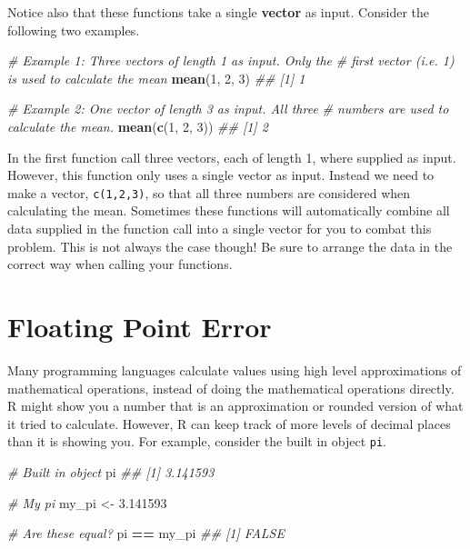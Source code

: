 \documentclass[
]{book}
\newenvironment{Shaded}{\begin{snugshade}}{\end{snugshade}}
\newcommand{\CommentTok}[1]{\textcolor[rgb]{0.56,0.35,0.01}{\textit{#1}}}
\newcommand{\DecValTok}[1]{\textcolor[rgb]{0.00,0.00,0.81}{#1}}
\newcommand{\FloatTok}[1]{\textcolor[rgb]{0.00,0.00,0.81}{#1}}
\newcommand{\KeywordTok}[1]{\textcolor[rgb]{0.13,0.29,0.53}{\textbf{#1}}}
\newcommand{\NormalTok}[1]{#1}
\newcommand{\OperatorTok}[1]{\textcolor[rgb]{0.81,0.36,0.00}{\textbf{#1}}}
\newcommand{\StringTok}[1]{\textcolor[rgb]{0.31,0.60,0.02}{#1}}
\begin{document}
Notice also that these functions take a single \textbf{vector} as input. Consider the following two examples.

\begin{Shaded}
\begin{Highlighting}[]

\CommentTok{# Example 1: Three vectors of length 1 as input.  Only the}
\CommentTok{# first vector (i.e. 1) is used to calculate the mean}
\KeywordTok{mean}\NormalTok{(}\DecValTok{1}\NormalTok{, }\DecValTok{2}\NormalTok{, }\DecValTok{3}\NormalTok{)}
\CommentTok{## [1] 1}

\CommentTok{# Example 2: One vector of length 3 as input.  All three}
\CommentTok{# numbers are used to calculate the mean.}
\KeywordTok{mean}\NormalTok{(}\KeywordTok{c}\NormalTok{(}\DecValTok{1}\NormalTok{, }\DecValTok{2}\NormalTok{, }\DecValTok{3}\NormalTok{))}
\CommentTok{## [1] 2}
\end{Highlighting}
\end{Shaded}

In the first function call three vectors, each of length 1, where supplied as input. However, this function only uses a single vector as input. Instead we need to make a vector, \texttt{c(1,2,3)}, so that all three numbers are considered when calculating the mean. Sometimes these functions will automatically combine all data supplied in the function call into a single vector for you to combat this problem. This is not always the case though! Be sure to arrange the data in the correct way when calling your functions.

\hypertarget{floating-point-error}{%
\section{Floating Point Error}\label{floating-point-error}}

Many programming languages calculate values using high level approximations of mathematical operations, instead of doing the mathematical operations directly. R might show you a number that is an approximation or rounded version of what it tried to calculate. However, R can keep track of more levels of decimal places than it is showing you. For example, consider the built in object \texttt{pi}.

\begin{Shaded}
\begin{Highlighting}[]
\CommentTok{# Built in object}
\NormalTok{pi}
\CommentTok{## [1] 3.141593}

\CommentTok{# My pi}
\NormalTok{my_pi <-}\StringTok{ }\FloatTok{3.141593}

\CommentTok{# Are these equal?}
\NormalTok{pi }\OperatorTok{==}\StringTok{ }\NormalTok{my_pi}
\CommentTok{## [1] FALSE}
\end{Highlighting}
\end{Shaded}
\end{document}
